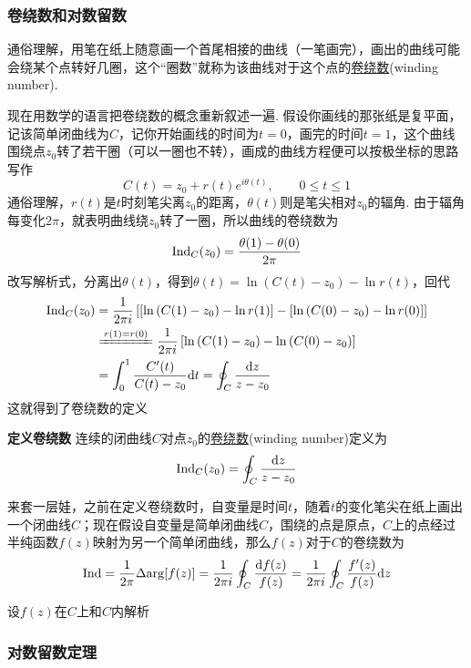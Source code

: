 \documentclass[UTF8]{ctexart}
\newcommand{\trm}[1]{{\rm #1}}
\newenvironment{definition}[1]
    {\begin{tcolorbox}[enhanced, colback=LightYellow, breakable=false, frame hidden, borderline west={1.5mm}{-2mm}{DarkGreen}]
    {\bfseries {\color{DarkGreen} 定义}\quad #1} \newline}
    {\end{tcolorbox}}
\begin{document}
\subsubsection{卷绕数和对数留数}

通俗理解，用笔在纸上随意画一个首尾相接的曲线（一笔画完），画出的曲线可能会绕某个点转好几圈，这个“圈数”就称为该曲线对于这个点的\uline{卷绕数}(winding number).

现在用数学的语言把卷绕数的概念重新叙述一遍. 假设你画线的那张纸是复平面，记该简单闭曲线为\(C\)，记你开始画线的时间为\(t=0\)，画完的时间\(t=1\)，这个曲线围绕点\(z_0\)转了若干圈（可以一圈也不转），画成的曲线方程便可以按极坐标的思路写作
\[C(t) = z_0 + r(t)e^{i\theta(t)}, \qquad 0 \leq t \leq 1\]
通俗理解，\(r(t)\)是\(t\)时刻笔尖离\(z_0\)的距离，\(\theta(t)\)则是笔尖相对\(z_0\)的辐角. 由于辐角每变化\(2\pi\)，就表明曲线绕\(z_0\)转了一圈，所以曲线的卷绕数为
\[ \trm{Ind}_C(z_0) = \frac{\theta(1)-\theta(0)}{2\pi} \]
改写解析式，分离出\(\theta(t)\)，得到\(\theta(t) = \ln \left(C(t) - z_0\right) - \ln r(t)\)，回代
\begin{align*}
    \trm{Ind}_C(z_0) &= \frac{1}{2\pi i}\left[\left[\ln \left(C(1) - z_0\right) - \ln r(1)\right]-\left[\ln \left(C(0) - z_0\right) - \ln r(0)\right]\right] \\
    & \xlongequal[]{r(1)=r(0)} \frac{1}{2\pi i}\left[\ln \left(C(1) - z_0\right)-\ln \left(C(0) - z_0\right)\right] \\
    & = \int_{0}^{1} \frac{C'(t)}{C(t)-z_0} \trm{d}t = \oint_{C}\frac{\trm{d}z}{z-z_0}
\end{align*}
这就得到了卷绕数的定义
\begin{definition}{卷绕数}
    连续的闭曲线\(C\)对点\(z_0\)的\uline{卷绕数}(winding number)定义为
    \[\trm{Ind}_C(z_0) = \oint_{C}\frac{\trm{d}z}{z-z_0}\]
\end{definition}

来套一层娃，之前在定义卷绕数时，自变量是时间\(t\)，随着\(t\)的变化笔尖在纸上画出一个闭曲线\(C\)；现在假设自变量是简单闭曲线\(C\)，围绕的点是原点，\(C\)上的点经过半纯函数\(f(z)\)映射为另一个简单闭曲线，那么\(f(z)\)对于\(C\)的卷绕数为
\[\trm{Ind} = \frac{1}{2\pi}\Delta\trm{arg} [f(z)] = \frac{1}{2\pi i}\oint_{C}\frac{\trm{d}f(z)}{f(z)} = \frac{1}{2\pi i}\oint_{C}\frac{f'(z)}{f(z)}\trm{d}z\]

设\(f(z)\)在\(C\)上和\(C\)内解析
\subsubsection{对数留数定理}
\end{document}
